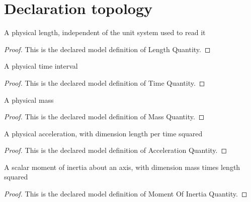 \section{Declaration topology}
\begin{definition}
  \label{def:physics:phyx-mini-0227:phyxminiproblems-problemphyxmini0227-lengthquantity}
  A physical length, independent of the unit system used to read it
\end{definition}
\begin{proof}
  This is the declared model definition of Length Quantity.
\end{proof}
\begin{definition}
  \label{def:physics:phyx-mini-0227:phyxminiproblems-problemphyxmini0227-timequantity}
  A physical time interval
\end{definition}
\begin{proof}
  This is the declared model definition of Time Quantity.
\end{proof}
\begin{definition}
  \label{def:physics:phyx-mini-0227:phyxminiproblems-problemphyxmini0227-massquantity}
  A physical mass
\end{definition}
\begin{proof}
  This is the declared model definition of Mass Quantity.
\end{proof}
\begin{definition}
  \label{def:physics:phyx-mini-0227:phyxminiproblems-problemphyxmini0227-accelerationquantity}
  A physical acceleration, with dimension length per time squared
\end{definition}
\begin{proof}
  This is the declared model definition of Acceleration Quantity.
\end{proof}
\begin{definition}
  \label{def:physics:phyx-mini-0227:phyxminiproblems-problemphyxmini0227-momentofinertiaquantity}
  A scalar moment of inertia about an axis, with dimension mass times length squared
\end{definition}
\begin{proof}
  This is the declared model definition of Moment Of Inertia Quantity.
\end{proof}
